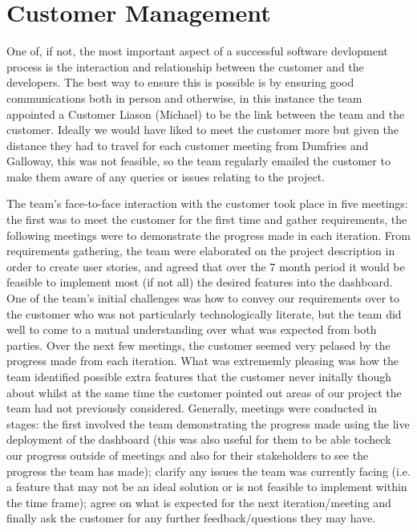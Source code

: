 \documentclass{l3proj}
\begin{document}

\section{Customer Management}
\label{sec:customer-management}


One of, if not, the most important aspect of a successful software devlopment process is the interaction and relationship
between the customer and the developers. The best way to ensure this is possible is by ensuring good communications
both in person and otherwise, in this instance the team appointed a Customer Liason (Michael) to be the link between the
team and the customer. Ideally we would have liked to meet the customer more but given the distance they had to travel
for each customer meeting from Dumfries and Galloway, this was not feasible, so the team regularly emailed the customer
to make them aware of any queries or issues relating to the project.

The team's face-to-face interaction with the customer took place in five meetings: the first was to meet the customer
for the first time and gather requirements, the following meetings were to demonstrate the progress made in each
iteration. From requirements gathering, the team were elaborated on the project description in order to create user stories,
and agreed that over the 7 month period it would be feasible to implement most (if not all) the desired features into the
dashboard. One of the team's initial challenges was how to convey our requirements over to the customer who was not particularly
technologically literate, but the team did well to come to a mutual understanding over what was expected from both parties.
Over the next few meetings, the customer seemed very pelased by the progress made from each iteration. What was extrememly
pleasing was how the team identified possible extra features that the customer never initally though about whilst at the
same time the customer pointed out areas of our project the team had not previously considered. Generally, meetings
were conducted in stages: the first involved the team demonstrating the progress made using the live deployment of the
dashboard (this was also useful for them to be able tocheck our progress outside of meetings and also for their
stakeholders to see the progress the team has made); clarify any issues the team was currently facing (i.e. a feature
that may not be an ideal solution or is not feasible to implement within the time frame); agree on what is expected
for the next iteration/meeting and finally ask the customer for any further feedback/questions they may have.
\end{document}
